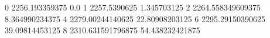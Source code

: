 0 2256.193359375 0.0
1 2257.5390625 1.345703125
2 2264.558349609375 8.364990234375
4 2279.00244140625 22.80908203125
6 2295.29150390625 39.09814453125
8 2310.631591796875 54.438232421875
